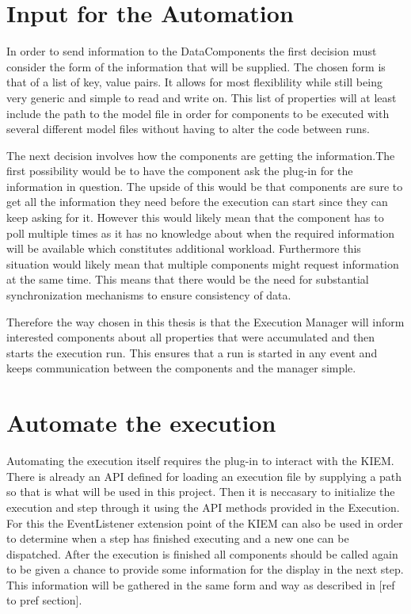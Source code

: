 \section{Input for the Automation}
\label{section:AutoConceptsInput}
In order to send information to the DataComponents the first decision must consider the
form of the information that will be supplied.
The chosen form is that of a list of key, value pairs. It allows for most
flexiblility while still being very generic and simple to read and write on.
This list of properties will at least include the path to the model file in order
for components to be executed with several different model files without having
to alter the code between runs.

The next decision involves how the components are getting the information.The first possibility 
would be to have the component ask the plug-in for the information
in question. The upside of this would be that components are sure to get all the information
they need before the execution can start since they can keep asking for it. However this would
likely mean that the component has to poll multiple times as it has no knowledge about when
the required information will be available which constitutes additional workload. Furthermore
this situation would likely mean that multiple components might request information
at the same time. This means that there would be the need for substantial synchronization mechanisms
to ensure consistency of data.

Therefore the way chosen in this thesis is that the Execution Manager will inform interested components
about all properties that were accumulated and then starts the execution run. This ensures
that a run is started in any event and keeps communication between the components and the manager simple.

\section{Automate the execution}
\label{section:AutoConceptsExecution}
Automating the execution itself requires the plug-in to interact with the KIEM.
There is already an API defined for loading an execution file by supplying a path so that
is what will be used in this project.
Then it is neccasary to initialize the execution and step through it using the API
methods provided in the Execution. For this the EventListener extension point of the 
KIEM can also be used in order to determine when a step has finished executing and
a new one can be dispatched.
After the execution is finished all components should be called again to be given
a chance to provide some information for the display in the next step. This information
will be gathered in the same form and way as described in [ref to pref section].


